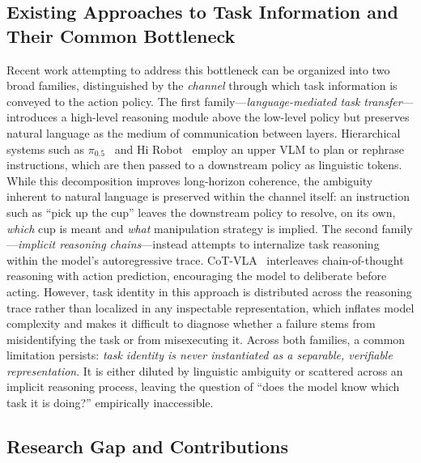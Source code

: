 \documentclass[11pt]{article}
\begin{document}
\subsection{Existing Approaches to Task Information and Their Common Bottleneck}

Recent work attempting to address this bottleneck can be organized into two broad families, distinguished by the \emph{channel} through which task information is conveyed to the action policy. The first family---\emph{language-mediated task transfer}---introduces a high-level reasoning module above the low-level policy but preserves natural language as the medium of communication between layers. Hierarchical systems such as $\pi_{0.5}$~\cite{pi05} and Hi Robot~\cite{hirobot} employ an upper VLM to plan or rephrase instructions, which are then passed to a downstream policy as linguistic tokens. While this decomposition improves long-horizon coherence, the ambiguity inherent to natural language is preserved within the channel itself: an instruction such as ``pick up the cup'' leaves the downstream policy to resolve, on its own, \emph{which} cup is meant and \emph{what} manipulation strategy is implied. The second family---\emph{implicit reasoning chains}---instead attempts to internalize task reasoning within the model's autoregressive trace. CoT-VLA~\cite{cotvla} interleaves chain-of-thought reasoning with action prediction, encouraging the model to deliberate before acting. However, task identity in this approach is distributed across the reasoning trace rather than localized in any inspectable representation, which inflates model complexity and makes it difficult to diagnose whether a failure stems from misidentifying the task or from misexecuting it. Across both families, a common limitation persists: \emph{task identity is never instantiated as a separable, verifiable representation}. It is either diluted by linguistic ambiguity or scattered across an implicit reasoning process, leaving the question of ``does the model know which task it is doing?'' empirically inaccessible.

\subsection{Research Gap and Contributions}
\end{document}

